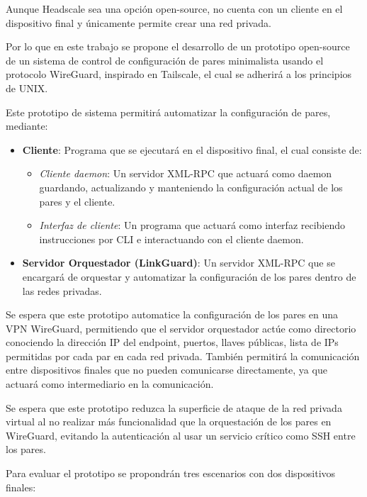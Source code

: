 \documentclass[letterpaper,12pt,oneside]{article}
\begin{document}
Aunque Headscale sea una opción open-source, no cuenta con un cliente en el dispositivo final y únicamente permite crear una red privada.

Por lo que en este trabajo se propone el desarrollo de un prototipo open-source de un sistema de control de configuración de pares minimalista usando el protocolo WireGuard, inspirado en Tailscale, el cual se adherirá a los principios de UNIX.

Este prototipo de sistema permitirá automatizar la configuración de pares, mediante:

\begin{itemize}
    \item \textbf{Cliente}: Programa que se ejecutará en el dispositivo final, el cual consiste de:
    \begin{itemize}
        \item \textit{Cliente daemon}: Un servidor XML-RPC que actuará como daemon guardando, actualizando y manteniendo la configuración actual de los pares y el cliente.
        \item \textit{Interfaz de cliente}: Un programa que actuará como interfaz recibiendo instrucciones por CLI e interactuando con el cliente daemon.
    \end{itemize}
    \item \textbf{Servidor Orquestador (LinkGuard)}: Un servidor XML-RPC que se encargará de orquestar y automatizar la configuración de los pares dentro de las redes privadas.
\end{itemize}

Se espera que este prototipo automatice la configuración de los pares en una VPN WireGuard, permitiendo que el servidor orquestador actúe como directorio conociendo la dirección IP del endpoint, puertos, llaves públicas, lista de IPs permitidas por cada par en cada red privada. También permitirá la comunicación entre dispositivos finales que no pueden comunicarse directamente, ya que actuará como intermediario en la comunicación.

Se espera que este prototipo reduzca la superficie de ataque de la red privada virtual al no realizar más funcionalidad que la orquestación de los pares en WireGuard, evitando la autenticación al usar un servicio crítico como SSH entre los pares.

Para evaluar el prototipo se propondrán tres escenarios con dos dispositivos finales:
\end{document}
